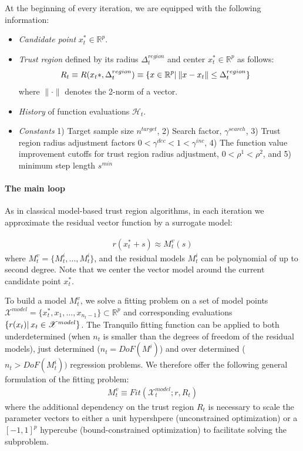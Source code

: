 At the beginning of every iteration, we are equipped with the following information:
\begin{itemize}
    \item\textit{Candidate point} $x_t^*\in\mathbb{R}^p$.

\item \textit{Trust region} defined by its radius $\Delta_t^{region}$ and center $x_t^*\in\mathbb{R}^p$ as follows:
\begin{align}
    R_t\equiv R(x_t&*,\Delta_t^{region})\equiv\{x\in\mathbb{R}^p|\hspace{0.2em}\lVert x-x_t\rVert\leq\Delta_t^{region}\}
    \label{eq:def-trustregion}
\end{align}
where $\lVert\cdot\rVert$ denotes the 2-norm of a vector.

\item \textit{History} of function evaluations $\mathcal{H}_t$.

\item \textit{Constants} 1) Target sample size $n^{target}$, 2) Search factor, $\gamma^{search}$, 3) Trust region radius adjustment factors $0<\gamma^{dec}<1<\gamma^{inc}$, 4) The function value improvement cutoffs for trust region radius adjustment, $0<\rho^1<\rho^2$, and 5) minimum step length $s^{min}$
\end{itemize}


\paragraph{The main loop} As in classical model-based trust region algorithms, in each iteration we approximate the residual vector function by a surrogate model:

\begin{align}
    r(x_t^*+s)\approx M_t^v(s)
    \label{eq:vec-model}
\end{align}
where $M_t^v = \{M_t^i,\dots,M_t^i\}$, and the residual models $M^i_t$ can be polynomial of up to second degree. Note that we center the vector model around the current candidate point $x_t^*$.


To build a model $M_t^v$, we solve a fitting problem on a set of model points $\mathcal{X}^{model}=\{x_t^*,x_1,\dots,x_{n_{t}-1}\}\subset\mathbb{R}^p$ and corresponding evaluations $\{r(x_t)|\hspace{0.2em} x_t\in\mathscr{X}^{model}\}$. The Tranquilo fitting function can be applied to both underdetermined (when $n_t$ is smaller than the degrees of freedom of the residual models), just determined ($n_t=DoF(M^i)$) and over determined ($n_t>DoF(M^i_t))$ regression problems. We therefore offer the following general formulation of the fitting problem:
\begin{align}
    M_t^v\equiv Fit(\mathcal{X}_t^{model};r,R_t)
    \label{eq:fit-model}
\end{align}
where the additional dependency on the trust region $R_t$ is necessary to scale the parameter vectors to either a unit hypershpere (unconstrained optimization) or a $[-1,1]^p$ hypercube (bound-constrained optimization) to facilitate solving the subproblem.

